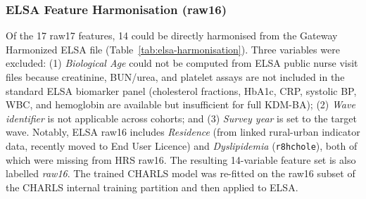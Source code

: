 \documentclass[11pt,a4paper]{article}
\begin{document}
\subsubsection*{ELSA Feature Harmonisation (raw16)}
Of the 17 raw17 features, 14 could be directly harmonised from the Gateway Harmonized ELSA file
(Table~\ref{tab:elsa-harmonisation}). Three variables were excluded: (1) \emph{Biological Age}
could not be computed from ELSA public nurse visit files because creatinine, BUN/urea, and
platelet assays are not included in the standard ELSA biomarker panel (cholesterol fractions,
HbA1c, CRP, systolic BP, WBC, and hemoglobin are available but insufficient for full KDM-BA);
(2) \emph{Wave identifier} is not applicable across cohorts; and (3) \emph{Survey year} is
set to the target wave. Notably, ELSA raw16 includes \emph{Residence} (from linked rural-urban
indicator data, recently moved to End User Licence) and \emph{Dyslipidemia}
(\texttt{r8hchole}), both of which were missing from HRS raw16. The resulting 14-variable
feature set is also labelled \emph{raw16}. The trained CHARLS model was re-fitted on the
raw16 subset of the CHARLS internal training partition and then applied to ELSA.
\end{document}
